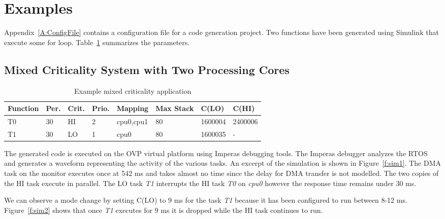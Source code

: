 \section{Examples}
\label{s:examples} 

	Appendix~\ref{A:ConfigFile} contains a configuration file for a code generation project. 
	Two functions have been generated using Simulink that execute some for loop. Table~\ref{t:config} summarizes the parameters.
	
	
\subsection{Mixed Criticality System with Two Processing Cores}	

\begin{table}[h]
\caption{Example mixed criticality application}
\centering

	\begin{tabular}{@{}llllllll@{}}
	Function & Per. & Crit. & Prio. & Mapping & Max Stack & C(LO) & C(HI) 	 \\
	
	\toprule
	T0 & 30 & HI & 2 & cpu0,cpu1 & 80 & 1600004 & 2400006 \\
	T1 & 30 & LO & 1 & cpu0 & 80 & 1600035 & - \\
	\end{tabular}

\label{t:config}
\end{table}
	

	The generated code is executed on the OVP virtual platform using Imperas debugging tools. The Imperas debugger analyzes the RTOS and generates a waveform representing the activity of the various tasks. 
	An excerpt of the simulation is shown in Figure~\ref{f:sim1}.
	The DMA task on the monitor executes once at 542 ms and takes almost no time since the delay for DMA transfer is not modelled.
	The two copies of the HI task execute in parallel. The LO task \emph{T1} interrupts the HI task \emph{T0} on \emph{cpu0} however the response time remains under 30 ms.

	We can observe a mode change by setting C(LO) to 9 ms for the task \emph{T1} because it has been configured to run between 8-12 ms. 
	Figure~\ref{f:sim2} shows that once \emph{T1} executes for 9 ms it is dropped while the HI task continues to run.
	 
